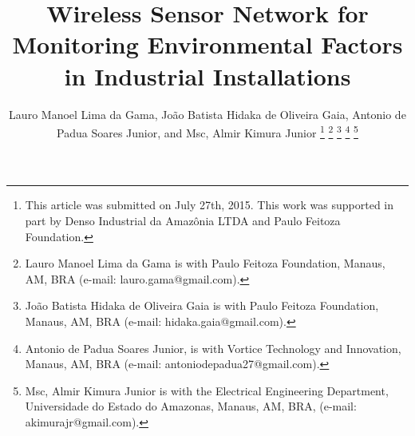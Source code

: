 \documentclass[letterpaper]{IEEEtran}
\begin{document}

%
\title{Wireless Sensor Network for Monitoring Environmental Factors in Industrial Installations}
%
%
%

\author{Lauro Manoel Lima da Gama, Jo\~ao Batista Hidaka de Oliveira Gaia, Antonio de Padua Soares Junior, and Msc, Almir Kimura Junior%
\thanks{This article was submitted on July 27th, 2015. This work was supported in part by Denso Industrial da Amaz\^{o}nia LTDA and Paulo Feitoza Foundation.}
\thanks{Lauro Manoel Lima da Gama is with Paulo Feitoza Foundation, Manaus, AM, BRA (e-mail: lauro.gama@gmail.com).}%
\thanks{ Jo\~ao Batista Hidaka de Oliveira Gaia is with Paulo Feitoza Foundation, Manaus, AM, BRA (e-mail:  hidaka.gaia@gmail.com).}%
\thanks{Antonio de Padua Soares Junior, is with Vortice Technology and Innovation, Manaus, AM, BRA (e-mail: antoniodepadua27@gmail.com).}
\thanks{Msc, Almir Kimura Junior is with the Electrical Engineering Department, Universidade do Estado do Amazonas, Manaus, AM, BRA, (e-mail: akimurajr@gmail.com).}}
\end{document}
